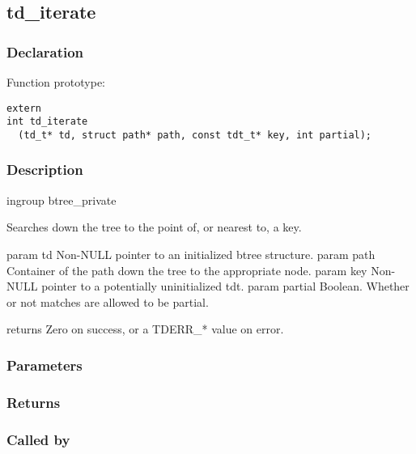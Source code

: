 
\newpage
\subsection{td\_iterate}
\subsubsection{Declaration} Function prototype:

\begin{verbatim}
extern
int td_iterate
  (td_t* td, struct path* path, const tdt_t* key, int partial);
\end{verbatim}

\subsubsection{Description}


 ingroup btree\_private

 Searches down the tree to the point of, or nearest to, a key.

 param td Non-NULL pointer to an initialized btree structure.
 param path Container of the path down the tree to the appropriate node.
 param key Non-NULL pointer to a potentially uninitialized tdt.
 param partial Boolean. Whether or not matches are allowed to be partial.

 returns Zero on success, or a TDERR\_* value on error.
 

\subsubsection{Parameters}
\subsubsection{Returns}
\subsubsection{Called by}

